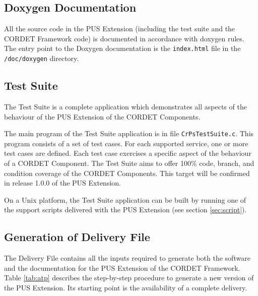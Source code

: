 \documentclass{pnp_article}
\begin{document}
\subsection{Doxygen Documentation}\label{sec:DoxygenDoc}
All the source code in the PUS Extension (including the test suite and the CORDET Framework code) is documented in accordance with doxygen rules. The entry point to the Doxygen documentation is the \texttt{index.html} file in the \texttt{/doc/doxygen} directory.

\subsection{Test Suite}\label{sec:TestSuite}
The Test Suite is a complete application which demonstrates all aspects of the behaviour of the PUS Extension of the CORDET Components.

The main program of the Test Suite application is in file \texttt{CrPsTestSuite.c}. This program consists of a set of test cases. For each supported service, one or more test cases are defined. Each test case exercises a specific aspect of the behaviour of a CORDET Component. The Test Suite aims to offer 100\% code, branch, and condition coverage of the CORDET Components. This target will be confirmed in release 1.0.0 of the PUS Extension.

On a Unix platform, the Test Suite application can be built by running one of the support scripts delivered with the PUS Extension (see section \ref{sec:script}). 

\subsection{Generation of Delivery File}\label{sec:atp}
The Delivery File contains all the inputs required to generate both the software and the documentation for the PUS Extension of the CORDET Framework. Table \ref{tab:atp} describes the step-by-step procedure to generate a new version of the PUS Extension. Its starting point is the availability of a complete delivery. 
\end{document}
